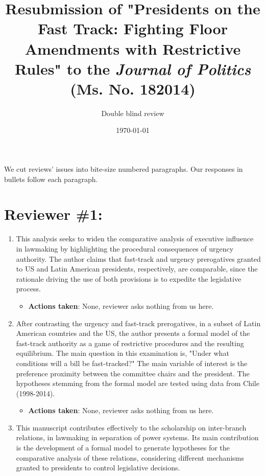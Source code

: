 \documentclass[article,letterpaper,times,12pt,listings-bw,microtype]{article}
\author{Double blind review}
\date{\today}
\title{Resubmission of "Presidents on the Fast Track: Fighting Floor Amendments with Restrictive Rules" to the \emph{Journal of Politics} (Ms. No. 182014)}
\begin{document}
\maketitle
\tableofcontents

\newpage

\noindent
We cut reviews' issues into bite-size numbered paragraphs. Our responses in bullets follow each paragraph.

\section{Reviewer \#1:}
\label{sec:org3522269}
\begin{enumerate}
\item This analysis seeks to widen the comparative analysis of executive influence in lawmaking by highlighting the procedural consequences of urgency authority. The author claims that fast-track and urgency prerogatives granted to US and Latin American presidents, respectively, are comparable, since the rationale driving the use of both provisions is to expedite the legislative process.
\label{sec:org7ea5322}
\begin{itemize}
\item \textbf{Actions taken}: None, reviewer asks nothing from us here.
\end{itemize}
\item After contrasting the urgency and fast-track prerogatives, in a subset of Latin American countries and the US, the author presents a formal model of the fast-track authority as a game of restrictive procedures and the resulting equilibrium. The main question in this examination is, "Under what conditions will a bill be fast-tracked?" The main variable of interest is the preference proximity between the committee chairs and the president. The hypotheses stemming from the formal model are tested using data from Chile (1998-2014).
\label{sec:org3dacab3}
\begin{itemize}
\item \textbf{Actions taken}: None, reviewer asks nothing from us here.
\end{itemize}
\item This manuscript contributes effectively to the scholarship on inter-branch relations, in lawmaking in separation of power systems. Its main contribution is the development of a formal model to generate hypotheses for the comparative analysis of these relations, considering different mechanisms granted to presidents to control legislative decisions.

\end{enumerate}
\end{document}

